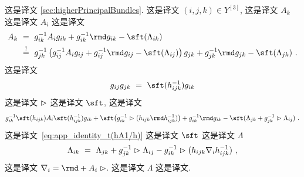 \documentclass[
    affil-it, %
    auth-lg, %
    british, %
    compression, %
    contents, %
    custom-packages={}, %
    references={bigone}, %
]{lib/preprint}
\begin{document}
\begin{body}
 这是译文 \cref{sec:higherPrincipalBundles}. 这是译文 $(i,j,k)\in Y^{[3]}$, 这是译文 $A_k$ 这是译文 $A_i$ 这是译文         \begin{equation}
            \begin{aligned}
                A_k\ &=\ g^{-1}_{ik}A_ig_{ik}+g^{-1}_{ik}\rmd g_{ik}-\sft(\Lambda_{ik})
                \\
                &\overset{!}{=}\ g^{-1}_{jk}\left(g^{-1}_{ij}A_ig_{ij}+g^{-1}_{ij}\rmd g_{ij}-\sft(\Lambda_{ij})\right)g_{jk}+g^{-1}_{jk}\rmd g_{jk}-\sft(\Lambda_{jk})~.
            \end{aligned}
        \end{equation}  这是译文 
        \begin{equation}\label{eq:cocycleForG}
            g_{ij}g_{jk}\ =\ \sft(h^{-1}_{ijk}) g_{ik}
        \end{equation}  这是译文 $\vartriangleright$ 这是译文 $\sft$, 这是译文         \begin{equation}
            g^{-1}_{ik}\sft(h_{ijk})A_i\sft(h^{-1}_{ijk})g_{ik}+\sft\big(g^{-1}_{ik}\acton (h_{ijk} \rmd h^{-1}_{ijk})\big)+g^{-1}_{ik}\rmd g_{ik}-\sft(\Lambda_{jk}+g^{-1}_{jk}\acton\Lambda_{ij})~.
        \end{equation}  这是译文~\eqref{eq:app_identity_t(hA1/h)} 这是译文 $\sft$ 这是译文 $\Lambda$         \begin{equation}\label{eq:cocycleForLambda}
            \Lambda_{ik}\ =\ \Lambda_{jk}+g_{jk}^{-1}\acton\Lambda_{ij}-g_{ik}^{-1}\acton(h_{ijk}\nabla_i h_{ijk}^{-1})~,
        \end{equation}  这是译文 $\nabla_i=\rmd+A_i\acton$. 这是译文 $\Lambda$ 这是译文.
        

\end{body}
\end{document}
